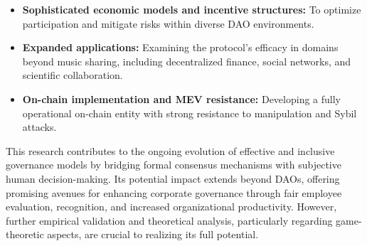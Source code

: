 \documentclass{article}
\begin{document}
\begin{CJK}{UTF8}{gbsn}
        \begin{itemize}
        \item \textbf{Sophisticated economic models and incentive structures:}  To optimize participation and mitigate risks within diverse DAO environments.
        \item \textbf{Expanded applications:} Examining the protocol's efficacy in domains beyond music sharing, including decentralized finance, social networks, and scientific collaboration.
        \item \textbf{On-chain implementation and MEV resistance:} Developing a fully operational on-chain entity with strong resistance to manipulation and Sybil attacks.
        \end{itemize}

        This research contributes to the ongoing evolution of effective and inclusive governance models by bridging formal consensus mechanisms with subjective human decision-making.  Its potential impact extends beyond DAOs, offering promising avenues for enhancing corporate governance through fair employee evaluation, recognition, and increased organizational productivity. However, further empirical validation and theoretical analysis, particularly regarding game-theoretic aspects, are crucial to realizing its full potential.


        \clearpage

    
    

    \clearpage\end{CJK}
\end{document}
